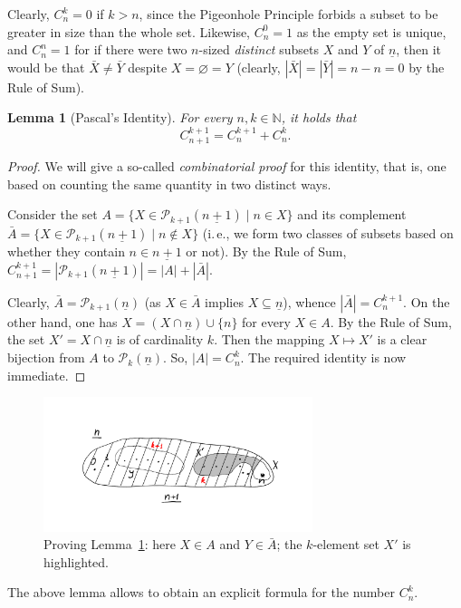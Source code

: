 \documentclass[12pt,notitlepage]{article}
\theoremstyle{plain}
\newtheorem{lemma}[thm]{Lemma}
\theoremstyle{definition}
\theoremstyle{plain}
\newcommand{\N}{\mathbb{N}}
\newcommand{\sbs}{\subseteq}
\newcommand{\void}{\varnothing}
\newcommand{\mP}{\mathcal{P}}
\newcommand{\ul}[1]{\underline{#1}}
\newcommand{\1}{\mathbf{1}}
\newcommand{\0}{\mathbf{0}}
\begin{document}
Clearly, $C_n^k = 0$ if $k > n$, since the Pigeonhole Principle forbids a subset to be greater in size than the whole set. Likewise, $C_n^0 = 1$ as the empty set is unique, and $C_n^n = 1$ for if there were two $n$-sized \emph{distinct} subsets $X$ and $Y$ of $\ul{n}$, then it would be that $\bar X \neq \bar Y$ despite $X = \void = Y$ (clearly, $|\bar X| = |\bar Y| = n - n = 0$ by the Rule of Sum).

\begin{lemma}[Pascal's Identity]\label{L11:pascal}
For every $n, k \in \N$, it holds that
$$C_{n + 1}^{k + 1} = C_n^{k + 1} + C^k_n.$$
\end{lemma}
\begin{proof} We will give a so-called \emph{combinatorial proof} for this identity, that is, one based on counting the same quantity in two distinct ways.

Consider the set $A = \{ X \in \mP_{k + 1}(\ul{n+1}) \mid n \in X \}$ and its complement $\bar A = \{ X \in \mP_{k + 1}(\ul{n+1}) \mid n \notin X \}$ (i.\,e., we form two classes of subsets based on whether they contain $n \in \ul{n+1}$ or not). By the Rule of Sum, $C^{k+1}_{n+1} = |\mP_{k + 1}(\ul{n+1})| = |A| + |\bar A|$. 

Clearly, $\bar A = \mP_{k + 1}(\ul{n})$ (as $X \in \bar A$ implies $X \sbs \ul{n}$), whence $|\bar A| = C_n^{k+1}$. On the other hand, one has $X = (X \cap \ul{n}) \cup \{ n \}$ for every $X \in A$. By the Rule of Sum, the set $X' = X \cap \ul{n}$ is of cardinality $k$. Then the mapping $X \mapsto X'$ is a clear bijection from $A$ to $\mP_k(\ul{n})$. So, $|A| = C_n^k$. The required identity is now immediate.
\end{proof}

\begin{figure}[h]
\centering
\includegraphics*[width=0.7\textwidth]{pascal.pdf}
\caption{Proving Lemma~\ref{L11:pascal}: here $X \in A$ and $Y \in \bar A$; the $k$-element set $X'$ is highlighted.}
\end{figure}


\noindent The above lemma allows to obtain an explicit formula for the number $C_n^k$.
\end{document}
